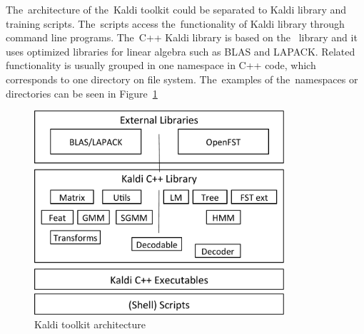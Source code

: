 The~architecture of the~Kaldi toolkit could be separated to Kaldi library and training scripts.
The~scripts access the~functionality of Kaldi library through command line programs.
The~C++ Kaldi library is based on the~\cite{allauzen2007openfst} library and it uses optimized libraries for linear algebra such as BLAS and LAPACK.
Related functionality is usually grouped in one namespace in C++ code, which corresponds to one directory on file system. 
The~examples of the~namespaces or directories can be seen in Figure~\ref{fig:kaldi_arch}

\begin{figure}[!htp]
    \begin{center}
        \includegraphics[width=25em]{images/kaldi-lib}
        \caption{Kaldi toolkit architecture\cite{povey2011kaldi}}
        \label{fig:kaldi_arch} 
    \end{center}
\end{figure}

